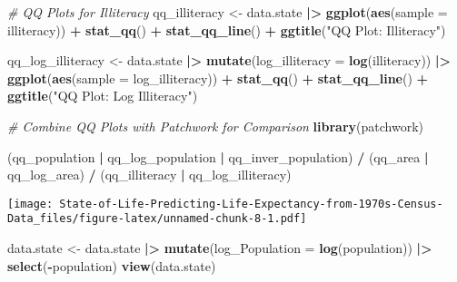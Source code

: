 \documentclass[
]{article}
\newenvironment{Shaded}{\begin{snugshade}}{\end{snugshade}}
\newcommand{\AttributeTok}[1]{\textcolor[rgb]{0.13,0.29,0.53}{#1}}
\newcommand{\CommentTok}[1]{\textcolor[rgb]{0.56,0.35,0.01}{\textit{#1}}}
\newcommand{\FunctionTok}[1]{\textcolor[rgb]{0.13,0.29,0.53}{\textbf{#1}}}
\newcommand{\NormalTok}[1]{#1}
\newcommand{\OtherTok}[1]{\textcolor[rgb]{0.56,0.35,0.01}{#1}}
\newcommand{\SpecialCharTok}[1]{\textcolor[rgb]{0.81,0.36,0.00}{\textbf{#1}}}
\newcommand{\StringTok}[1]{\textcolor[rgb]{0.31,0.60,0.02}{#1}}
\begin{document}
\begin{Shaded}
\begin{Highlighting}[]
\CommentTok{\# QQ Plots for Illiteracy}
\NormalTok{qq\_illiteracy }\OtherTok{\textless{}{-}}\NormalTok{ data.state }\SpecialCharTok{|\textgreater{}}
  \FunctionTok{ggplot}\NormalTok{(}\FunctionTok{aes}\NormalTok{(}\AttributeTok{sample =}\NormalTok{ illiteracy)) }\SpecialCharTok{+}
  \FunctionTok{stat\_qq}\NormalTok{() }\SpecialCharTok{+}
  \FunctionTok{stat\_qq\_line}\NormalTok{() }\SpecialCharTok{+}
  \FunctionTok{ggtitle}\NormalTok{(}\StringTok{"QQ Plot: Illiteracy"}\NormalTok{)}

\NormalTok{qq\_log\_illiteracy }\OtherTok{\textless{}{-}}\NormalTok{ data.state }\SpecialCharTok{|\textgreater{}}
  \FunctionTok{mutate}\NormalTok{(}\AttributeTok{log\_illiteracy =} \FunctionTok{log}\NormalTok{(illiteracy)) }\SpecialCharTok{|\textgreater{}}
  \FunctionTok{ggplot}\NormalTok{(}\FunctionTok{aes}\NormalTok{(}\AttributeTok{sample =}\NormalTok{ log\_illiteracy)) }\SpecialCharTok{+}
  \FunctionTok{stat\_qq}\NormalTok{() }\SpecialCharTok{+}
  \FunctionTok{stat\_qq\_line}\NormalTok{() }\SpecialCharTok{+}
  \FunctionTok{ggtitle}\NormalTok{(}\StringTok{"QQ Plot: Log Illiteracy"}\NormalTok{)}

\CommentTok{\# Combine QQ Plots with Patchwork for Comparison}
\FunctionTok{library}\NormalTok{(patchwork)}

\NormalTok{(qq\_population }\SpecialCharTok{|}\NormalTok{ qq\_log\_population }\SpecialCharTok{|}\NormalTok{ qq\_inver\_population) }\SpecialCharTok{/} 
\NormalTok{(qq\_area }\SpecialCharTok{|}\NormalTok{ qq\_log\_area) }\SpecialCharTok{/} 
\NormalTok{(qq\_illiteracy }\SpecialCharTok{|}\NormalTok{ qq\_log\_illiteracy)}
\end{Highlighting}
\end{Shaded}

\texttt{[image: State-of-Life-Predicting-Life-Expectancy-from-1970s-Census-Data\_files/figure-latex/unnamed-chunk-8-1.pdf]}

\begin{Shaded}
\begin{Highlighting}[]
\NormalTok{data.state }\OtherTok{\textless{}{-}}\NormalTok{ data.state }\SpecialCharTok{|\textgreater{}}
  \FunctionTok{mutate}\NormalTok{(}\AttributeTok{log\_Population =} \FunctionTok{log}\NormalTok{(population)) }\SpecialCharTok{|\textgreater{}}
  \FunctionTok{select}\NormalTok{(}\SpecialCharTok{{-}}\NormalTok{population)}
\FunctionTok{view}\NormalTok{(data.state)}
\end{Highlighting}
\end{Shaded}
\end{document}
